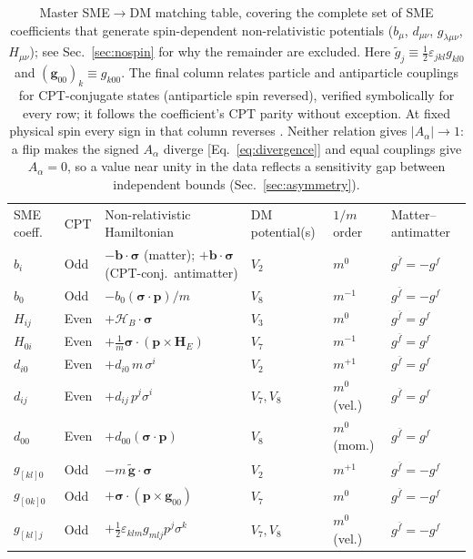 \documentclass[
  aps,
  prd,
  reprint,
  amsmath,
  amssymb,
  nofootinbib,
  superscriptaddress,
  floatfix
]{revtex4-2}
\newcommand{\Aalpha}{A_\alpha}
\newcommand{\sig}{\bm{\sigma}}
\begin{document}
\begin{table}[t]
\caption{\label{tab:master}%
Master SME$\to$DM matching table, covering the complete set of SME
coefficients that generate spin-dependent non-relativistic potentials
($b_\mu$, $d_{\mu\nu}$, $g_{\lambda\mu\nu}$, $H_{\mu\nu}$); see
Sec.~\ref{sec:nospin} for why the remainder are excluded. Here
$\tilde g_j\equiv\tfrac12\varepsilon_{jkl}g_{kl0}$ and
$(\mathbf g_{00})_k\equiv g_{k00}$.
The final column relates particle and antiparticle couplings for
CPT-conjugate states (antiparticle spin reversed), verified symbolically for
every row; it follows the coefficient's CPT parity without exception. At
fixed physical spin every sign in that column reverses
\cite{KosteleckyLane1999b}. Neither relation gives $|\Aalpha|\to1$: a flip
makes the signed $\Aalpha$ diverge [Eq.~\eqref{eq:divergence}] and equal
couplings give $\Aalpha=0$, so a value near unity in the data reflects a
sensitivity gap between independent bounds (Sec.~\ref{sec:asymmetry}).}
\begin{ruledtabular}
\begin{tabular}{llllll}
SME coeff. & CPT & Non-relativistic Hamiltonian & DM potential(s) &
$1/m$ order & Matter--antimatter \\
\colrule
$b_i$      & Odd  & $-\mathbf{b}\cdot\sig$ (matter); $+\mathbf{b}\cdot\sig$ (CPT-conj.\ antimatter) & $V_2$      & $m^{0}$        & $g^{\bar f}=-g^{f}$ \\
$b_0$      & Odd  & $-b_0(\sig\cdot\mathbf{p})/m$                                        & $V_8$      & $m^{-1}$       & $g^{\bar f}=-g^{f}$ \\
$H_{ij}$   & Even & $+\bm{\mathcal{H}}_B\cdot\sig$                                       & $V_3$      & $m^{0}$        & $g^{\bar f}=g^{f}$ \\
$H_{0i}$   & Even & $+\frac{1}{m}\sig\cdot(\mathbf{p}\times\mathbf{H}_E)$                & $V_7$      & $m^{-1}$       & $g^{\bar f}=g^{f}$ \\
$d_{i0}$   & Even & $+d_{i0}\,m\,\sigma^i$                                               & $V_2$      & $m^{+1}$       & $g^{\bar f}=g^{f}$ \\
$d_{ij}$   & Even & $+d_{ij}\,p^j\sigma^i$                                               & $V_7,V_8$  & $m^{0}$ (vel.) & $g^{\bar f}=g^{f}$ \\
$d_{00}$   & Even & $+d_{00}(\sig\cdot\mathbf{p})$                                       & $V_8$      & $m^{0}$ (mom.) & $g^{\bar f}=g^{f}$ \\
$g_{[kl]0}$& Odd  & $-m\,\tilde{\mathbf g}\cdot\sig$                                       & $V_2$      & $m^{+1}$       & $g^{\bar f}=-g^{f}$ \\
$g_{[0k]0}$& Odd  & $+\sig\cdot(\mathbf p\times\mathbf{g}_{00})$                           & $V_7$      & $m^{0}$        & $g^{\bar f}=-g^{f}$ \\
$g_{[kl]j}$& Odd  & $+\tfrac12\varepsilon_{klm}g_{mlj}p^j\sigma^k$                        & $V_7,V_8$  & $m^{0}$ (vel.) & $g^{\bar f}=-g^{f}$ \\
\end{tabular}
\end{ruledtabular}
\end{table}
\end{document}
